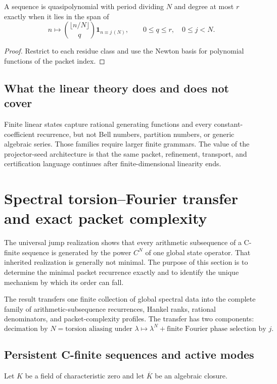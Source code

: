 \documentclass[11pt]{article}
\theoremstyle{definition}\newtheorem{definition}[theorem]{Definition}\newtheorem{example}[theorem]{Example}\newtheorem{construction}[theorem]{Construction}\newtheorem{algorithm}[theorem]{Algorithm}\newtheorem{conjecture}[theorem]{Conjecture}\newtheorem{problem}[theorem]{Problem}
\theoremstyle{remark}\newtheorem{remark}[theorem]{Remark}\newtheorem{boundary}[theorem]{Boundary}\newtheorem{certificate}[theorem]{Computational Certificate}\newtheorem{classical}[theorem]{Classical Input}\newtheorem{principle}[theorem]{Structural Principle}
\begin{document}
\begin{proposition}
A sequence is quasipolynomial with period dividing $N$ and degree at most $r$ exactly when it lies in the span of
\[
 n\longmapsto \binom{\lfloor n/N\rfloor}{q}\mathbf 1_{n\equiv j\,(N)},
 \qquad 0\leq q\leq r,
 \quad 0\leq j<N.
\]
\end{proposition}
\begin{proof}
Restrict to each residue class and use the Newton basis for polynomial functions of the packet index.
\end{proof}

\subsection{What the linear theory does and does not cover}
Finite linear states capture rational generating functions and every constant-coefficient recurrence, but not Bell numbers, partition numbers, or generic algebraic series.  Those families require larger finite grammars.  The value of the projector-seed architecture is that the same packet, refinement, transport, and certification language continues after finite-dimensional linearity ends.


\section{Spectral torsion--Fourier transfer and exact packet complexity}
\label{sec:spectral-transfer}

The universal jump realization shows that every arithmetic subsequence of a C-finite sequence is generated by the power $C^N$ of one global state operator.  That inherited realization is generally not minimal.  The purpose of this section is to determine the minimal packet recurrence exactly and to identify the unique mechanism by which its order can fall.

The result transfers one finite collection of global spectral data into the complete family of arithmetic-subsequence recurrences, Hankel ranks, rational denominators, and packet-complexity profiles.  The transfer has two components:
\[
 \boxed{
 \text{decimation by }N
 =
 \text{torsion aliasing under }\lambda\mapsto\lambda^N
 +
 \text{finite Fourier phase selection by }j.
 }
\]

\subsection{Persistent C-finite sequences and active modes}
Let $K$ be a field of characteristic zero and let $\overline K$ be an algebraic closure.
\end{document}
